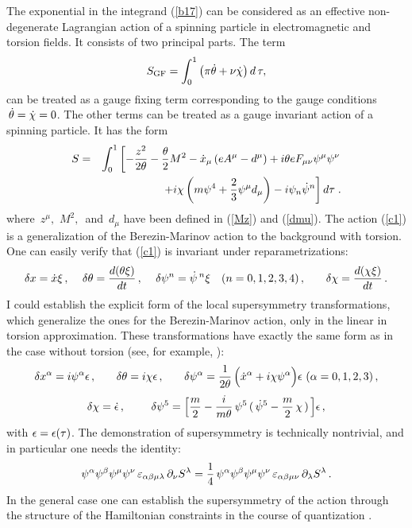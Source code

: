 The exponential in the integrand (\ref{b17}) can be considered as an
effective non-degenerate Lagrangian action of a spinning particle
in electromagnetic and torsion fields. It consists of two principal
parts. The term
$$
S_{\rm GF} = \int_0^1\left(\pi \dot{\theta} + \nu \dot{\chi}
\right)d\,\tau,
$$
can be treated as a gauge fixing term corresponding to the gauge 
conditions $\,\dot{\theta} = \dot{\chi} = 0$.
The other terms can be treated as a gauge 
invariant action of a spinning particle. It has the form
\begin{eqnarray}
\label{c1}
S &=& \int_0^1 \left[-\frac{z^{2}}
{2\theta}-\frac{\theta}{2}M^{2} -\dot{x}_\mu\left(eA^\mu-d^\mu\right)
+i\theta e F_{\mu \nu}\psi^{\mu}\psi^{\nu} \right. \nonumber \\
&&\left.+i\chi\left(m\psi^4+\frac{2}{3}\psi^{\mu}d_\mu\right)
-i\psi_{n}\dot{\psi}^{n}\right]d\tau\;.
\end{eqnarray}
where
$\,z^\mu,\,\, M^2,\,$ and $\, d_\mu$ have been defined 
in (\ref{Mz}) and (\ref{dmu}).
The action (\ref{c1}) is a generalization of the
Berezin-Marinov action \cite{BerMa75,Casal76} to the background
with torsion. One can easily verify that (\ref{c1}) is invariant
under reparametrizations:
$$ %
\de x = {\dot x}\xi\,,\,\,\,\,\,\,\,
\de \th = \frac{d(\th\xi)}{dt}\,,\,\,\,\,\,\,\,
\de \psi^n = {\dot \psi}\,^n\xi \,\,\,\,\,\,
(n=0,1,2,3,4)\,,\,\,\,\,\,\,\,\,\,\,\,
\de\chi = \frac{d(\chi\xi)}{dt}\,.
$$ %
I could establish the explicit form of the local supersymmetry
transformations, which generalize the ones for the
Berezin-Marinov action, only in the linear in torsion approximation.
These transformations have exactly the same form as in the case
without torsion (see, for example, \cite{GitSa93}):
$$
\delta x^\alpha = i\psi^\alpha\epsilon \,,\,\,\,\,\,\,\,\,\,\,\,
\delta \theta = i\chi\epsilon \,,\,\,\,\,\,\,\,\,\,\,\,
\delta \psi^\alpha = \frac{1}{2\theta}\,\Big({\dot x}^\alpha + i\chi\psi^\alpha\Big)\epsilon
\,\,(\alpha=0,1,2,3)\,,
$$
$$ %
\de\chi = {\dot \ep}\,,\,\,\,\,\,\,\,\,\,\,\,\,\,\,
\de \psi^5 = \Big[\frac{m}{2} - \frac{i}{m\th}\,\psi^5\,
(\,{\dot \psi}^5 -\frac{m}{2}\,\chi\,)\,\Big]\ep\,,
$$ %
with $\epsilon=\epsilon(\tau)$.
The demonstration of supersymmetry is technically nontrivial,
and in particular one needs the identity:
$$
\psi^\alpha\psi^\beta\psi^\mu\psi^\nu\,\varepsilon_{\alpha\beta\mu\lambda}\,\partial_\nu S^\lambda=
\frac14\,
\psi^\alpha\psi^\beta\psi^\mu\psi^\nu\,\varepsilon_{\alpha\beta\mu\nu}\,\partial_\lambda S^\lambda\,.
$$
In the general case one can establish the supersymmetry of the action
through the structure of the Hamiltonian constraints in the
course of quantization \cite{gegi}.
\vskip 3mm

